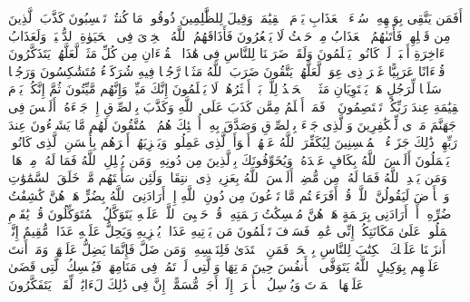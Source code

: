 \stopbuffer%
\startbuffer[\q:39:24]
أَفَمَن یَتَّقِی بِوَجۡهِهِۦ سُوۤءَ ٱلۡعَذَابِ یَوۡمَ ٱلۡقِیَٰمَةِۚ وَقِیلَ لِلظَّٰلِمِینَ ذُوقُوا۟ مَا كُنتُمۡ تَكۡسِبُونَ%
\stopbuffer%
\startbuffer[\q:39:25]
كَذَّبَ ٱلَّذِینَ مِن قَبۡلِهِمۡ فَأَتَىٰهُمُ ٱلۡعَذَابُ مِنۡ حَیۡثُ لَا یَشۡعُرُونَ%
\stopbuffer%
\startbuffer[\q:39:26]
فَأَذَاقَهُمُ ٱللَّهُ ٱلۡخِزۡیَ فِی ٱلۡحَیَوٰةِ ٱلدُّنۡیَاۖ وَلَعَذَابُ ٱلۡءَاخِرَةِ أَكۡبَرُۚ لَوۡ كَانُوا۟ یَعۡلَمُونَ%
\stopbuffer%
\startbuffer[\q:39:27]
وَلَقَدۡ ضَرَبۡنَا لِلنَّاسِ فِی هَٰذَا ٱلۡقُرۡءَانِ مِن كُلِّ مَثَلࣲ لَّعَلَّهُمۡ یَتَذَكَّرُونَ%
\stopbuffer%
\startbuffer[\q:39:28]
قُرۡءَانًا عَرَبِیًّا غَیۡرَ ذِی عِوَجࣲ لَّعَلَّهُمۡ یَتَّقُونَ%
\stopbuffer%
\startbuffer[\q:39:29]
ضَرَبَ ٱللَّهُ مَثَلࣰا رَّجُلࣰا فِیهِ شُرَكَاۤءُ مُتَشَٰكِسُونَ وَرَجُلࣰا سَلَمࣰا لِّرَجُلٍ هَلۡ یَسۡتَوِیَانِ مَثَلًاۚ ٱلۡحَمۡدُ لِلَّهِۚ بَلۡ أَكۡثَرُهُمۡ لَا یَعۡلَمُونَ%
\stopbuffer%
\startbuffer[\q:39:30]
إِنَّكَ مَیِّتࣱ وَإِنَّهُم مَّیِّتُونَ%
\stopbuffer%
\startbuffer[\q:39:31]
ثُمَّ إِنَّكُمۡ یَوۡمَ ٱلۡقِیَٰمَةِ عِندَ رَبِّكُمۡ تَخۡتَصِمُونَ%
\stopbuffer%
\startbuffer[\q:39:32]
۞ فَمَنۡ أَظۡلَمُ مِمَّن كَذَبَ عَلَى ٱللَّهِ وَكَذَّبَ بِٱلصِّدۡقِ إِذۡ جَاۤءَهُۥۤۚ أَلَیۡسَ فِی جَهَنَّمَ مَثۡوࣰى لِّلۡكَٰفِرِینَ%
\stopbuffer%
\startbuffer[\q:39:33]
وَٱلَّذِی جَاۤءَ بِٱلصِّدۡقِ وَصَدَّقَ بِهِۦۤ أُو۟لَٰۤئِكَ هُمُ ٱلۡمُتَّقُونَ%
\stopbuffer%
\startbuffer[\q:39:34]
لَهُم مَّا یَشَاۤءُونَ عِندَ رَبِّهِمۡۚ ذَٰلِكَ جَزَاۤءُ ٱلۡمُحۡسِنِینَ%
\stopbuffer%
\startbuffer[\q:39:35]
لِیُكَفِّرَ ٱللَّهُ عَنۡهُمۡ أَسۡوَأَ ٱلَّذِی عَمِلُوا۟ وَیَجۡزِیَهُمۡ أَجۡرَهُم بِأَحۡسَنِ ٱلَّذِی كَانُوا۟ یَعۡمَلُونَ%
\stopbuffer%
\startbuffer[\q:39:36]
أَلَیۡسَ ٱللَّهُ بِكَافٍ عَبۡدَهُۥۖ وَیُخَوِّفُونَكَ بِٱلَّذِینَ مِن دُونِهِۦۚ وَمَن یُضۡلِلِ ٱللَّهُ فَمَا لَهُۥ مِنۡ هَادࣲ%
\stopbuffer%
\startbuffer[\q:39:37]
وَمَن یَهۡدِ ٱللَّهُ فَمَا لَهُۥ مِن مُّضِلٍّۗ أَلَیۡسَ ٱللَّهُ بِعَزِیزࣲ ذِی ٱنتِقَامࣲ%
\stopbuffer%
\startbuffer[\q:39:38]
وَلَئِن سَأَلۡتَهُم مَّنۡ خَلَقَ ٱلسَّمَٰوَٰتِ وَٱلۡأَرۡضَ لَیَقُولُنَّ ٱللَّهُۚ قُلۡ أَفَرَءَیۡتُم مَّا تَدۡعُونَ مِن دُونِ ٱللَّهِ إِنۡ أَرَادَنِیَ ٱللَّهُ بِضُرٍّ هَلۡ هُنَّ كَٰشِفَٰتُ ضُرِّهِۦۤ أَوۡ أَرَادَنِی بِرَحۡمَةٍ هَلۡ هُنَّ مُمۡسِكَٰتُ رَحۡمَتِهِۦۚ قُلۡ حَسۡبِیَ ٱللَّهُۖ عَلَیۡهِ یَتَوَكَّلُ ٱلۡمُتَوَكِّلُونَ%
\stopbuffer%
\startbuffer[\q:39:39]
قُلۡ یَٰقَوۡمِ ٱعۡمَلُوا۟ عَلَىٰ مَكَانَتِكُمۡ إِنِّی عَٰمِلࣱۖ فَسَوۡفَ تَعۡلَمُونَ%
\stopbuffer%
\startbuffer[\q:39:40]
مَن یَأۡتِیهِ عَذَابࣱ یُخۡزِیهِ وَیَحِلُّ عَلَیۡهِ عَذَابࣱ مُّقِیمٌ%
\stopbuffer%
\startbuffer[\q:39:41]
إِنَّاۤ أَنزَلۡنَا عَلَیۡكَ ٱلۡكِتَٰبَ لِلنَّاسِ بِٱلۡحَقِّۖ فَمَنِ ٱهۡتَدَىٰ فَلِنَفۡسِهِۦۖ وَمَن ضَلَّ فَإِنَّمَا یَضِلُّ عَلَیۡهَاۖ وَمَاۤ أَنتَ عَلَیۡهِم بِوَكِیلٍ%
\stopbuffer%
\startbuffer[\q:39:42]
ٱللَّهُ یَتَوَفَّى ٱلۡأَنفُسَ حِینَ مَوۡتِهَا وَٱلَّتِی لَمۡ تَمُتۡ فِی مَنَامِهَاۖ فَیُمۡسِكُ ٱلَّتِی قَضَىٰ عَلَیۡهَا ٱلۡمَوۡتَ وَیُرۡسِلُ ٱلۡأُخۡرَىٰۤ إِلَىٰۤ أَجَلࣲ مُّسَمًّىۚ إِنَّ فِی ذَٰلِكَ لَءَایَٰتࣲ لِّقَوۡمࣲ یَتَفَكَّرُونَ%
\stopbuffer%
